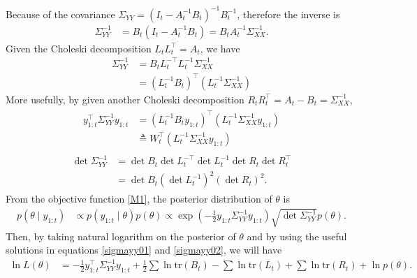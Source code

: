 Because of the covariance  $\Sigma_{YY} =  \left(I_t-A_t^{-1}B_t\right)^{-1}B_t^{-1}$, therefore the inverse is 
\begin{align*}
\Sigma_{YY}^{-1} &= B_t\left(I_t-A_t^{-1}B_t\right)= B_tA_t^{-1}\Sigma_{XX}^{-1}.
\end{align*}
Given the Choleski decomposition $L_tL_t^\top = A_t$, we have
\begin{align*}
\Sigma_{YY}^{-1} &=B_tL_t^{-\top}L_t^{-1}\Sigma_{XX}^{-1}\\
&=\left(L_t^{-1}B_t\right)^\top\left(L_t^{-1}\Sigma_{XX}^{-1}\right) %
\end{align*}
More usefully, by given another Choleski decomposition $R_tR_t^\top=A_t-B_t=\Sigma_{XX}^{-1}$,
\begin{align}\label{sigmayy01}
\begin{split}
y_{1:t}^\top \Sigma_{YY}^{-1} y_{1:t} &= \left(L_t^{-1}B_ty_{1:t}\right)^\top\left(L_t^{-1}\Sigma_{XX}^{-1}y_{1:t}\right)\\
&\triangleq W_t^\top \left(L_t^{-1}\Sigma_{XX}^{-1}y_{1:t}\right)
\end{split}
\end{align}
\begin{align}\label{sigmayy02}
\begin{split}
\det\Sigma_{YY}^{-1} &= \det B_t \det L_t^{-\top}\det L_t^{-1}\det R_t\det R_t^\top\\
&= \det B_t\left(\det L_t^{-1}\right)^2\left(\det R_t\right)^2.
\end{split}
\end{align}
From the objective function \eqref{M1}, the posterior distribution of $\theta$ is 
\begin{align*}
p\left(\theta \mid y_{1:t}\right) &\propto p\left(y_{1:t}\mid\theta\right)p\left(\theta\right) \propto \exp\left( -\frac{1}{2} y_{1:t} \Sigma_{YY}^{-1} y_{1:t} \right) \sqrt{\det \Sigma_{YY}^{-1}} p\left(\theta\right).
\end{align*}
Then, by taking natural logarithm on the posterior of $\theta$ and by using the useful solutions in equations \eqref{sigmayy01} and \eqref{sigmayy02}, we will have
\begin{align}
\ln L\left(\theta\right) &= -\frac{1}{2}y_{1:t}^\top\Sigma_{YY}^{-1}y_{1:t}+\frac{1}{2}\sum\ln\mbox{tr}\left(B_t\right)-\sum\ln\mbox{tr}\left(L_t\right)+\sum\ln\mbox{tr}\left(R_t\right) + \ln p\left(\theta\right).
\end{align}



